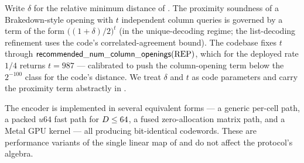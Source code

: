 \begin{remark}
\label{rem:distance}
Write $\delta$ for the relative minimum distance of . The
proximity soundness of a Brakedown-style opening with $t$ independent
column queries is governed by a term of the form
$\bigl((1+\delta)/2\bigr)^{t}$ (in the unique-decoding regime; the
list-decoding refinement uses the code's correlated-agreement bound). The
codebase fixes $t$ through
$\mathsf{recommended\_num\_column\_openings}(\mathrm{REP})$, which for the
deployed rate $1/4$ returns $t = 987$ --- calibrated to push the
column-opening term below the $2^{-100}$ class for the code's distance.
We treat $\delta$ and $t$ as code parameters and carry the proximity term
abstractly in .
\end{remark}

\begin{remark}
The encoder is implemented in several equivalent forms --- a generic
per-cell path, a packed $u64$ fast path for $D \le 64$, a fused
zero-allocation matrix path, and a Metal GPU kernel --- all producing
bit-identical codewords. These are performance variants of the single
linear map of  and do not affect the protocol's algebra.
\end{remark}
